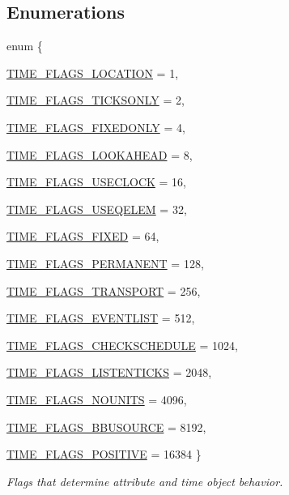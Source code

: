 \subsection*{Enumerations}
\begin{DoxyCompactItemize}
\item 
enum \{ \par
\hyperlink{group__time_gga99fb83031ce9923c84392b4e92f956b5ac80606ccbb9a16c14cf81874e4de2408}{TIME\_\-FLAGS\_\-LOCATION} =  1, 
\par
\hyperlink{group__time_gga99fb83031ce9923c84392b4e92f956b5af93981eb3922895394877d099323a2e8}{TIME\_\-FLAGS\_\-TICKSONLY} =  2, 
\par
\hyperlink{group__time_gga99fb83031ce9923c84392b4e92f956b5a5b35f210c105cc2e49a4c2c18c48c10c}{TIME\_\-FLAGS\_\-FIXEDONLY} =  4, 
\par
\hyperlink{group__time_gga99fb83031ce9923c84392b4e92f956b5a4cb8e2884262140884e647d609747a82}{TIME\_\-FLAGS\_\-LOOKAHEAD} =  8, 
\par
\hyperlink{group__time_gga99fb83031ce9923c84392b4e92f956b5a91f2cee835f5cf871a657101b6ff7b4e}{TIME\_\-FLAGS\_\-USECLOCK} =  16, 
\par
\hyperlink{group__time_gga99fb83031ce9923c84392b4e92f956b5a46a7548bed973b5cef7e6fcbb5883c4f}{TIME\_\-FLAGS\_\-USEQELEM} =  32, 
\par
\hyperlink{group__time_gga99fb83031ce9923c84392b4e92f956b5ac97bc4400b25656b5570c12d6817a662}{TIME\_\-FLAGS\_\-FIXED} =  64, 
\par
\hyperlink{group__time_gga99fb83031ce9923c84392b4e92f956b5af2db490f1904d9f1e834f9ea062ad67e}{TIME\_\-FLAGS\_\-PERMANENT} =  128, 
\par
\hyperlink{group__time_gga99fb83031ce9923c84392b4e92f956b5a7ddd9e0fa3dc6a7b346fc3dcee5c5c81}{TIME\_\-FLAGS\_\-TRANSPORT} =  256, 
\par
\hyperlink{group__time_gga99fb83031ce9923c84392b4e92f956b5a273bc93db911e7ea106e5839d9263382}{TIME\_\-FLAGS\_\-EVENTLIST} =  512, 
\par
\hyperlink{group__time_gga99fb83031ce9923c84392b4e92f956b5ad16eb0fa4c44658f55146763452b3481}{TIME\_\-FLAGS\_\-CHECKSCHEDULE} =  1024, 
\par
\hyperlink{group__time_gga99fb83031ce9923c84392b4e92f956b5a22fec8e51f11f945f8b94279a6df37df}{TIME\_\-FLAGS\_\-LISTENTICKS} =  2048, 
\par
\hyperlink{group__time_gga99fb83031ce9923c84392b4e92f956b5a5f103c6561c69e7759621cd216d0176b}{TIME\_\-FLAGS\_\-NOUNITS} =  4096, 
\par
\hyperlink{group__time_gga99fb83031ce9923c84392b4e92f956b5a4dc0bf02a08234ce8b66e8ecb5ec568e}{TIME\_\-FLAGS\_\-BBUSOURCE} =  8192, 
\par
\hyperlink{group__time_gga99fb83031ce9923c84392b4e92f956b5a4d4396aa4c56efec83245821ea888235}{TIME\_\-FLAGS\_\-POSITIVE} =  16384
 \}
\begin{DoxyCompactList}\small\item\em Flags that determine attribute and time object behavior. \item\end{DoxyCompactList}\end{DoxyCompactItemize}
